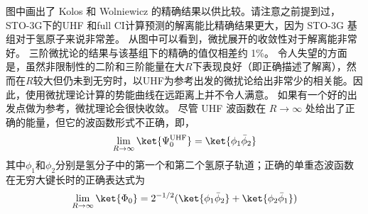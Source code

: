 图中画出了 Kolos 和 Wolniewicz 的精确结果以供比较。请注意之前提到过，STO-3G下的UHF 和full CI计算预测的解离能比精确结果更大，因为 STO-3G 基组对于氢原子来说非常差。 从图中可以看到，微扰展开的收敛性对于解离能非常好。 三阶微扰论的结果与该基组下的精确的值仅相差约 1\%。 令人失望的方面是，虽然非限制性的二阶和三阶能量在大$R$下表现良好（即正确描述了解离），然而在$R$较大但仍未到无穷时，以UHF为参考出发的微扰论给出非常少的相关能。因此，使用微扰理论计算的势能曲线在远距离上并不令人满意。 如果有一个好的出发点做为参考，微扰理论会很快收敛。 尽管 UHF 波函数在 $R\to\infty$ 处给出了正确的能量，但它的波函数形式不正确，即，
\begin{align}
	\lim_{R\to\infty} \ket{\Psi_0^\mathrm{UHF}} = \ket{\phi_1\bar{\phi}_2}
\end{align}
其中$\phi_1$和$\phi_2$分别是氢分子中的第一个和第二个氢原子轨道；正确的单重态波函数在无穷大键长时的正确表达式为
\begin{align}
	\lim_{R\to\infty}\ket{\Phi_0} = 2^{-1/2}(\ket{\phi_1\bar{\phi}_2}+\ket{\phi_2\bar{\phi}_1})
\end{align}

